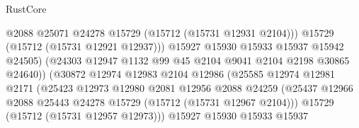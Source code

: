 \begin{lexlean}{RustCore}
\begin{coremodule}
                                            @2088
                                            @25071
                                            @24278
                                            @15729
                                            (@15712 (@15731 @12931 @2104)))
                                          @15729
                                          (@15712 (@15731 @12921 @12937)))
                                        @15927
                                        @15930
                                        @15933
                                        @15937
                                        @15942
                                        @24505)
                                      (@24303
                                        @12947
                                        @1132
                                        @99
                                        @45
                                        @2104
                                        @9041
                                        @2104
                                        @2198
                                        @30865
                                        @24640))
                                    (@30872
                                      @12974
                                      @12983
                                      @2104
                                      @12986
                                      (@25585
                                        @12974
                                        @12981
                                        @2171
                                        (@25423
                                          @12973
                                          @12980
                                          @2081
                                          @12956
                                          @2088
                                          @24259
                                          (@25437
                                            @12966
                                            @2088
                                            @25443
                                            @24278
                                            @15729
                                            (@15712 (@15731 @12967 @2104)))
                                          @15729
                                          (@15712 (@15731 @12957 @12973)))
                                        @15927
                                        @15930
                                        @15933
                                        @15937

\end{coremodule}
\end{lexlean}
